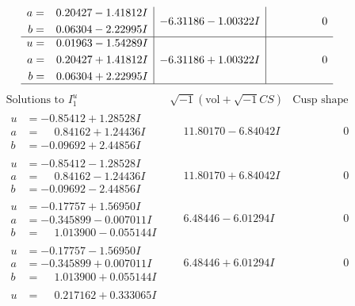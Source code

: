 \documentclass[1p]{elsarticle_modified}
\theoremstyle{definition}
\newcommand{\I}{\sqrt{-1}}
\begin{document}
$$\begin{array}{c|c|c}
\begin{aligned}
a &= \phantom{-}0.20427 - 1.41812 I \\
b &= \phantom{-}0.06304 - 2.22995 I\end{aligned}
 & -6.31186 - 1.00322 I & \phantom{-0.000000 } 0 \\ \hline\begin{aligned}
u &= \phantom{-}0.01963 - 1.54289 I \\
a &= \phantom{-}0.20427 + 1.41812 I \\
b &= \phantom{-}0.06304 + 2.22995 I\end{aligned}
 & -6.31186 + 1.00322 I & \phantom{-0.000000 } 0\\
 \hline 
 \end{array}$$\newpage$$\begin{array}{c|c|c}  
\text{Solutions to }I^u_{1}& \I (\text{vol} + \sqrt{-1}CS) & \text{Cusp shape}\\
 \hline 
\begin{aligned}
u &= -0.85412 + 1.28528 I \\
a &= \phantom{-}0.84162 + 1.24436 I \\
b &= -0.09692 + 2.44856 I\end{aligned}
 & \phantom{-}11.80170 - 6.84042 I & \phantom{-0.000000 } 0 \\ \hline\begin{aligned}
u &= -0.85412 - 1.28528 I \\
a &= \phantom{-}0.84162 - 1.24436 I \\
b &= -0.09692 - 2.44856 I\end{aligned}
 & \phantom{-}11.80170 + 6.84042 I & \phantom{-0.000000 } 0 \\ \hline\begin{aligned}
u &= -0.17757 + 1.56950 I \\
a &= -0.345899 - 0.007011 I \\
b &= \phantom{-}1.013900 - 0.055144 I\end{aligned}
 & \phantom{-}6.48446 - 6.01294 I & \phantom{-0.000000 } 0 \\ \hline\begin{aligned}
u &= -0.17757 - 1.56950 I \\
a &= -0.345899 + 0.007011 I \\
b &= \phantom{-}1.013900 + 0.055144 I\end{aligned}
 & \phantom{-}6.48446 + 6.01294 I & \phantom{-0.000000 } 0 \\ \hline\begin{aligned}
u &= \phantom{-}0.217162 + 0.333065 I \\

\end{aligned}
\end{array}$$
\end{document}
